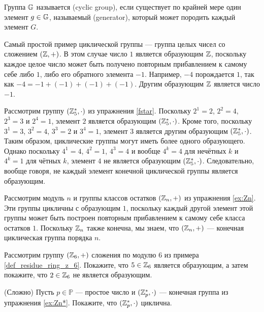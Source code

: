 \begin{definition}\label{cyclic-groups}
Группа $\mathbb{G}$ называется  (cyclic group), если существует по крайней мере один элемент $g\in \mathbb{G}$, называемый  (generator), который может породить каждый элемент $G$.
\end{definition}

\begin{example}
\label{example:cyclic_group_of_integers} Самый простой пример циклической группы — группа целых чисел со сложением $(\mathbb{Z},+)$. В этом случае число $1$ является образующим $\mathbb{Z}$, поскольку каждое целое число может быть получено повторным прибавлением к самому себе либо $1$, либо его обратного элемента $-1$. Например, $-4$ порождается $1$, так как $-4=-1+(-1)+(-1)+(-1)$. Другим образующим $\mathbb{Z}$ является число $-1$.
\end{example}
\begin{example}
\label{example:cyclic_group_F5*} Рассмотрим группу $(\mathbb{Z}_5^*,\cdot)$ из упражнения \ref{fstar}. Поскольку $2^1=2$, $2^2=4$, $2^3=3$ и $2^4=1$, элемент $2$ является образующим $(\mathbb{Z}_5^*,\cdot)$. Кроме того, поскольку $3^1=3$, $3^2=4$, $3^3=2$ и $3^4=1$, элемент $3$ является другим образующим $(\mathbb{Z}_5^*,\cdot)$. Таким образом, циклические группы могут иметь более одного образующего. Однако поскольку $4^1=4$, $4^2=1$, $4^3=4$ и вообще $4^k=4$ для нечётных $k$ и $4^k=1$ для чётных $k$, элемент $4$ не является образующим $(\mathbb{Z}_5^*,\cdot)$. Следовательно, вообще говоря, не каждый элемент конечной циклической группы является образующим.
\end{example}
\begin{example} Рассмотрим модуль $n$ и группы классов остатков $(\mathbb{Z}_n,+)$ из упражнения \ref{ex:Zn}. Эти группы цикличны с образующим $1$, поскольку каждый другой элемент этой группы может быть построен повторным прибавлением к самому себе класса остатков $1$. Поскольку $\mathbb{Z}_n$ также конечна, мы знаем, что $(\mathbb{Z}_n,+)$ — конечная циклическая группа порядка $n$.
\end{example}
\begin{exercise}
\label{example:cyclic_group_F6}
Рассмотрим группу $(\mathbb{Z}_6,+)$ сложения по модулю $6$ из примера \ref{def_residue_ring_z_6}. Покажите, что $5\in \mathbb{Z}_6$ является образующим, а затем покажите, что $2\in \mathbb{Z}_6$ не является образующим.
\end{exercise}
\begin{exercise}\label{ex:modulus-prime-group}(Сложно) Пусть $p\in\mathbb{P}$ — простое число и $(\mathbb{Z}_p^*,\cdot)$ — конечная группа из упражнения \ref{ex:Zn*}. Покажите, что $(\mathbb{Z}_p^*,\cdot)$ циклична.
\end{exercise}

